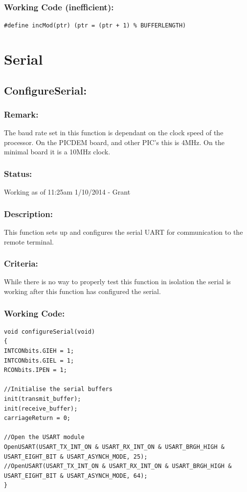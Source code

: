 \documentclass[]{report}
\begin{document}
\subsubsection{Working Code (inefficient):}
\begin{lstlisting}
#define incMod(ptr) (ptr = (ptr + 1) % BUFFERLENGTH)
\end{lstlisting}

\newpage
\section{Serial}

\subsection{ConfigureSerial:}
\subsubsection{Remark:}
The baud rate set in this function is dependant on the clock speed of the processor. On the PICDEM board, and other PIC's this is 4MHz. On the minimal board it is a 10MHz clock.

\subsubsection{Status:}
Working as of 11:25am 1/10/2014 - Grant

\subsubsection{Description:}
This function sets up and configures the serial UART for communication to the remote terminal.

\subsubsection{Criteria:}
While there is no way to properly test this function in isolation the serial is working after this function has configured the serial.

\subsubsection{Working Code:}
\begin{lstlisting}
void configureSerial(void)
{
INTCONbits.GIEH = 1;
INTCONbits.GIEL = 1;
RCONbits.IPEN = 1;

//Initialise the serial buffers
init(transmit_buffer);
init(receive_buffer);
carriageReturn = 0;

//Open the USART module
OpenUSART(USART_TX_INT_ON & USART_RX_INT_ON & USART_BRGH_HIGH & USART_EIGHT_BIT & USART_ASYNCH_MODE, 25);
//OpenUSART(USART_TX_INT_ON & USART_RX_INT_ON & USART_BRGH_HIGH & USART_EIGHT_BIT & USART_ASYNCH_MODE, 64);
}
\end{lstlisting}
\end{document}
